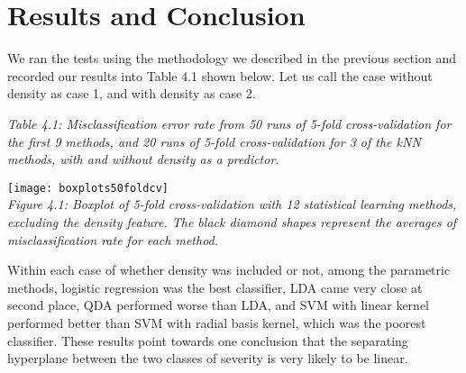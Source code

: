 \documentclass[11pt]{article}
\begin{document}
	\section{Results and Conclusion}
	We ran the tests using the methodology we described in the previous section and recorded our results into Table 4.1 shown below. Let us call the case without density as case 1, and with density as case 2.
	
	\begin{center}
	\end{center}

	\textit{Table 4.1: Misclassification error rate from 50 runs of 5-fold cross-validation for the first 9 methods, and 20 runs of 5-fold cross-validation for 3 of the kNN methods, with and without density as a predictor.}
	
	\texttt{[image: boxplots50foldcv]}\\
	\textit{Figure 4.1: Boxplot of 5-fold cross-validation with 12 statistical learning methods, excluding the density feature. The black diamond shapes represent the averages of misclassification rate for each method.}
	
	Within each case of whether density was included or not, among the parametric methods, logistic regression was the best classifier, LDA came very close at second place, QDA performed worse than LDA, and SVM with linear kernel performed better than SVM with radial basis kernel, which was the poorest classifier. These results point towards one conclusion that the separating hyperplane between the two classes of severity is very likely to be linear.
	
\end{document}

